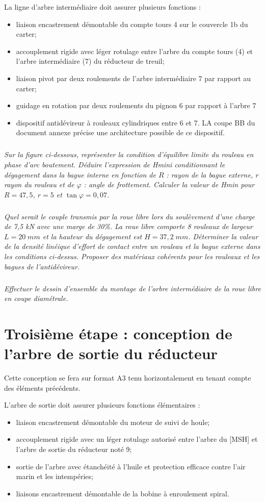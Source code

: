 \documentclass[10pt]{article}
\begin{document}
La ligne d'arbre intermédiaire doit assurer plusieurs fonctions :
\begin{itemize}
\item liaison encastrement démontable du compte tours 4 sur le couvercle 1b du carter;
\item accouplement rigide avec léger rotulage entre l'arbre du compte tours (4) et l'arbre intermédiaire (7) du réducteur de treuil;
\item liaison pivot par deux roulements de l'arbre intermédiaire 7 par rapport au carter;
\item guidage en rotation par deux roulements du pignon 6 par rapport à l'arbre 7
\item dispositif antidévireur à rouleaux cylindriques entre 6 et 7. LA coupe BB du document annexe précise une architecture possible de ce dispositif. 
\end{itemize}

\subparagraph{}
\textit{Sur la figure ci-dessous, représenter la condition d'équilibre limite du rouleau en phase d'arc boutement. Déduire l'expression de Hmini conditionnant le dégagement dans la bague interne en fonction de $R$ : rayon de la bague externe, $r$ rayon du rouleau et de $\varphi$ : angle de frottement.
Calculer la valeur de Hmin pour $R=47,5$, $r=5$ et $\tan\varphi = 0,07$.}

\subparagraph{}
\textit{Quel serait le couple transmis par la roue libre lors du soulèvement d'une charge de 7,5 kN avec une marge de 30\%.
La roue libre comporte 8 rouleaux de largeur $L=20\;mm$ et la hauteur du dégagement est $H=37,2\; mm$. Déterminer la valeur de la densité linéique d'effort de contact entre un rouleau et la bague externe dans les conditions ci-dessus.
Proposer des matériaux cohérents pour les rouleaux et les bagues de l'antidévireur.}


\subparagraph{}
\textit{Effectuer le dessin d'ensemble du montage de l'arbre intermédiaire de la roue libre en coupe diamétrale.}


\section{Troisième étape : conception de l'arbre de sortie du réducteur}

Cette conception se fera sur format A3 tenu horizontalement en tenant compte des éléments précédents.

L'arbre de sortie doit assurer plusieurs fonctions élémentaires :
\begin{itemize}
\item liaison encastrement démontable du moteur de suivi de houle;
\item accouplement rigide avec un léger rotulage autorisé entre l'arbre du [MSH] et l'arbre de sortie du réducteur noté 9;
\item sortie de l'arbre avec étanchéité à l'huile et protection efficace contre l'air marin et les intempéries;
\item liaisons encastrement démontable de la bobine à enroulement spiral.
\end{itemize}
\end{document}
